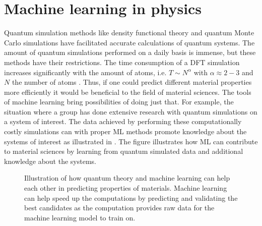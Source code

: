 \chapter{Machine learning in physics}\label{chap:ml_in_physics}
\thispagestyle{empty}
Quantum simulation methods like density functional theory and quantum Monte Carlo simulations have facilitated accurate calculations of quantum systems. The amount of quantum simulations performed on a daily basis is immense, but these methods have their restrictions. The time consumption of a DFT simulation increases significantly with the amount of atoms, i.e. $T\sim N^{\alpha}$ with $\alpha \approx 2-3$ and $N$ the number of atoms \citep{KohnNobelLecture}. Thus, if one could predict different material properties more efficiently it would be beneficial to the field of material sciences. The tools of machine learning bring possibilities of doing just that. For example, the situation where a group has done extensive research with quantum simulations on a system of interest. The data achieved by performing these computationally costly simulations can with proper ML methods promote knowledge about the systems of interest as illustrated in . The figure illustrates how ML can contribute to material sciences by learning from quantum simulated data and additional knowledge about the systems. 
\begin{figure}[ht]
    \centering
    \caption[Machine learning and Quantum Computations]{Illustration of how quantum theory and machine learning can help each other in predicting properties of materials. Machine learning can help speed up the computations by predicting and validating the best candidates as the computation provides raw data for the machine learning model to train on. }
    \label{fig:mlandquant}
\end{figure}
